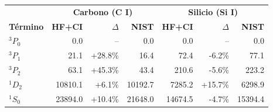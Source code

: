 
\begin{tabular}{l|rrr|rrr}
    \toprule
     & \multicolumn{3}{c|}{\textbf{Carbono (C I)}} & \multicolumn{3}{c}{\textbf{Silicio (Si I)}} \\
    \textbf{Término} & \textbf{HF+CI} & $\Delta$ & \textbf{NIST} & \textbf{HF+CI} & $\Delta$ & \textbf{NIST} \\
    \midrule
    $^3P_0$ & 0.0 & -- & 0.0 & 0.0 & -- & 0.0 \\
    $^3P_1$ & 21.1 & +28.8\% & 16.4 & 72.4 & -6.2\% & 77.1 \\
    $^3P_2$ & 63.1 & +45.3\% & 43.4 & 210.6 & -5.6\% & 223.2 \\
    $^1D_2$ & 10810.1 & +6.1\% & 10192.7 & 7285.2 & +15.7\% & 6298.9 \\
    $^1S_0$ & 23894.0 & +10.4\% & 21648.0 & 14674.5 & -4.7\% & 15394.4 \\
    \bottomrule
\end{tabular}
